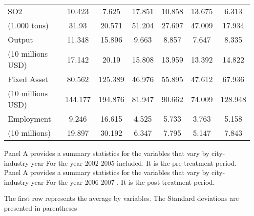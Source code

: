 \documentclass[
  convert={
    density=800 -alpha deactivate,
    size=1080x800,
    outext=.png
  },
]{standalone}
\begin{document}
\begin{adjustbox}{varwidth=\maxdimen,max width=\linewidth}
\begin{threeparttable}
\begin{tabular}{l*{6}{c}}
    SO2	&10.423&	7.625&	17.851	&10.858&	13.675&	6.313\\
    (1.000 tons)	&31.93	&20.571	&51.204&	27.697	&47.009	&17.934\\
    Output&	11.348&	15.896	&9.663	&8.857&	7.647&	8.335\\
    (10 millions USD)&	17.142&	20.19	&15.808	&13.959	&13.392&	14.822\\
    Fixed Asset&	80.562&	125.389	&46.976	&55.895&	47.612&	67.936\\
    (10 millions USD)&	144.177&	194.876	&81.947&	90.662&	74.009&	128.948\\
    Employment&	9.246	&16.615	&4.525	&5.733&	3.763&	5.158\\
    (10 millions)	&19.897&	30.192	&6.347	&7.795&	5.147&	7.843\\
    \bottomrule

  \end{tabular}
  \begin{tablenotes}
      \small
      \item Panel A provides a summary statistics for the variables that vary by city-industry-year For the year 2002-2005 included. It is the pre-treatment period. Panel A provides a summary statistics for the variables that vary by city-industry-year For the year 2006-2007 . It is the post-treatment period.
      
      The first row represents the average by variables. The Standard deviations are presented in parentheses
    \end{tablenotes}
\end{threeparttable} 
\label{tab:addlabel}
\end{adjustbox}
\end{document}
